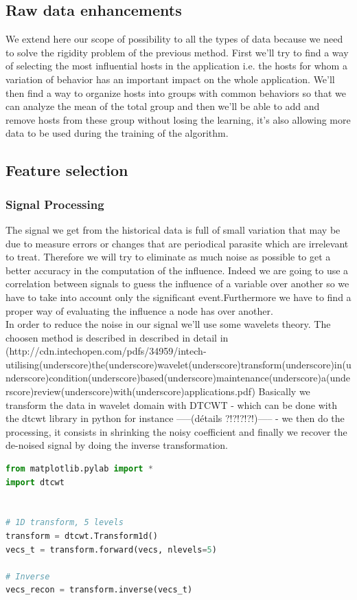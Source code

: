 \documentclass[10pt,a4paper,oneside]{article}
\begin{document}
\begin{multicols}{2}
\section{Raw data enhancements}
We extend here our scope of possibility to all the types of data because we need to solve the rigidity problem of the previous method. First we'll try to find a way of selecting the most influential hosts in the application i.e. the hosts for whom a variation of behavior has an important impact on the whole application. We'll then find a way to organize hosts into groups with common behaviors so that we can analyze the mean of the total group and then we'll be able to add and remove hosts from these group without losing the learning, it's also allowing more data to be used during the training of the algorithm.
\subsection{Feature selection}
\subsubsection{Signal Processing}
The signal we get from the historical data is full of small variation that may be due to measure errors or changes that are periodical parasite which are irrelevant to treat. Therefore we will try to eliminate as much noise as possible to get a better accuracy in the computation of the influence. Indeed we are going to use a correlation between signals to guess the influence of a variable over another so we have to take into account only the significant event.Furthermore we have to find a proper way of evaluating the influence a node has over another.
\\
In order to reduce the noise in our signal we'll use some wavelets theory. The choosen method is described in described in detail in (http://cdn.intechopen.com/pdfs/34959/intech-utilising(underscore)the(underscore)wavelet(underscore)transform(underscore)in(underscore)condition(underscore)based(underscore)maintenance(underscore)a(underscore)review(underscore)with(underscore)applications.pdf)
Basically we transform the data in wavelet domain with DTCWT - which can be done with the dtcwt library in python for instance -----(détails ?!?!?!?!)----- - we then do the processing, it consists in shrinking the noisy coefficient and finally we recover the de-noised signal by doing the inverse transformation.
\end{multicols}
\begin{lstlisting}[language=Python, caption=Python dtcwt library example]
from matplotlib.pylab import *
import dtcwt


# 1D transform, 5 levels
transform = dtcwt.Transform1d()
vecs_t = transform.forward(vecs, nlevels=5)

# Inverse
vecs_recon = transform.inverse(vecs_t)
\end{lstlisting}
\end{document}
